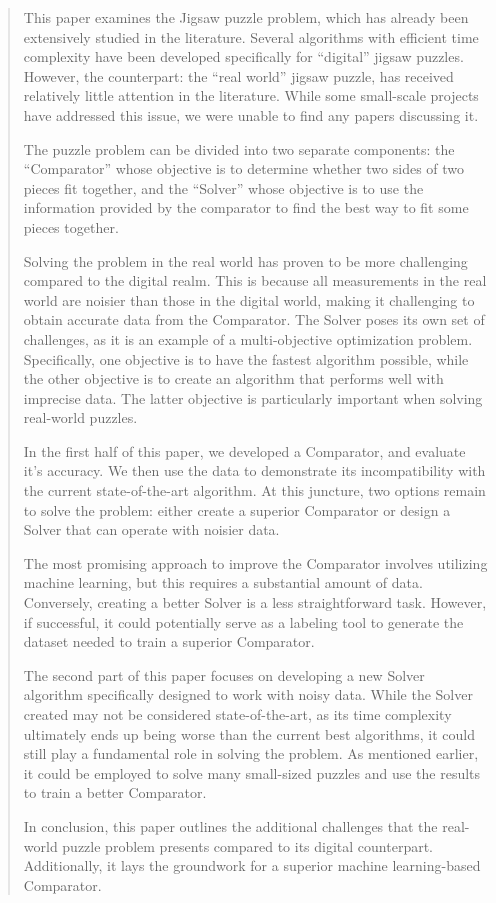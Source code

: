 \documentclass[epsfig,a4paper,11pt,titlepage,twoside,openany]{article}
\begin{document}
\cleardoublepage
\begin{abstract}
This paper examines the Jigsaw puzzle problem,
which has already been extensively studied in the literature.
Several algorithms with efficient time complexity have been developed
specifically for ``digital'' jigsaw puzzles. However, the counterpart:
the ``real world'' jigsaw puzzle, has received relatively little attention
in the literature. While some small-scale projects have addressed this issue,
we were unable to find any papers discussing it.

The puzzle problem can be divided into two separate components: the ``Comparator''
whose objective is to determine whether two sides of two pieces fit together,
and the ``Solver'' whose objective is to use the information provided
by the comparator to find the best way to fit some pieces together.

Solving the problem in the real world has proven to be more challenging compared
to the digital realm.
This is because all measurements in the real world are noisier than those
in the digital world, making it challenging to obtain accurate data from the Comparator.
The Solver poses its own set of challenges, as it is an example of a
multi-objective optimization problem. Specifically, one objective is to have
the fastest algorithm possible,
while the other objective is to create an algorithm that performs well with
imprecise data. The latter objective is particularly important when solving
real-world puzzles.

In the first half of this paper, we developed a Comparator, and evaluate it's accuracy.
We then use the data to demonstrate its incompatibility with the current
state-of-the-art algorithm. At this juncture,
two options remain to solve the problem:
either create a superior Comparator or design a
Solver that can operate with noisier data.

The most promising approach to improve the Comparator
involves utilizing machine learning, but this requires a substantial amount of data.
Conversely, creating a better Solver is a less straightforward task.
However, if successful, it could potentially serve as a labeling tool
to generate the dataset needed to train a superior Comparator.

The second part of this paper focuses on developing a
new Solver algorithm specifically designed to work with noisy data.
While the Solver created may not be considered state-of-the-art,
as its time complexity ultimately ends up being worse than the current
best algorithms, it could still play a fundamental role in solving the problem.
As mentioned earlier, it could be employed to solve many small-sized
puzzles and use the results to train a better Comparator.

In conclusion, this paper outlines the additional challenges that the real-world
puzzle problem presents compared to its digital counterpart.
Additionally, it lays the groundwork for a superior machine learning-based Comparator.

\end{abstract}
\cleardoublepage
{
  \hypersetup{linkcolor=black}
  \tableofcontents
}
\newpage
\cleardoublepage
{}
\end{document}
